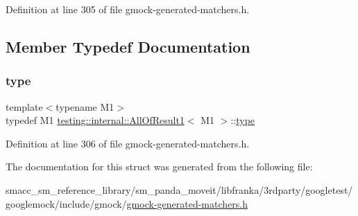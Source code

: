 Definition at line 305 of file gmock-\/generated-\/matchers.\+h.



\subsection{Member Typedef Documentation}
\mbox{\label{structtesting_1_1internal_1_1AllOfResult1_a19b95d4ddf7f4044a78665d9e253db10}} 
\subsubsection{\texorpdfstring{type}{type}}
{\footnotesize\ttfamily template$<$typename M1$>$ \\
typedef M1 \hyperlink{structtesting_1_1internal_1_1AllOfResult1}{testing\+::internal\+::\+All\+Of\+Result1}$<$ M1 $>$\+::\hyperlink{structtesting_1_1internal_1_1AllOfResult1_a19b95d4ddf7f4044a78665d9e253db10}{type}}



Definition at line 306 of file gmock-\/generated-\/matchers.\+h.



The documentation for this struct was generated from the following file\+:\begin{DoxyCompactItemize}
\item 
smacc\+\_\+sm\+\_\+reference\+\_\+library/sm\+\_\+panda\+\_\+moveit/libfranka/3rdparty/googletest/googlemock/include/gmock/\hyperlink{gmock-generated-matchers_8h}{gmock-\/generated-\/matchers.\+h}\end{DoxyCompactItemize}
